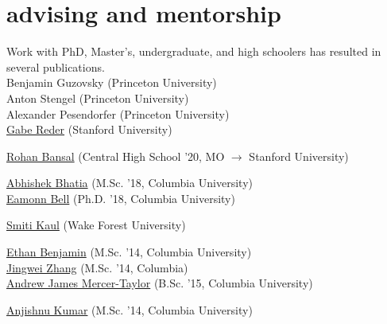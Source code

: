 \documentclass[4pt, letterpaper]{article}
\begin{document}
\section*{advising and mentorship}
Work with PhD, Master's, undergraduate, and high schoolers has resulted in several publications.\\
Benjamin Guzovsky (Princeton University)\\
Anton Stengel (Princeton University)\\
Alexander Pesendorfer (Princeton University)\\
\href{https://vpge.stanford.edu/people/gabe-reder}{Gabe Reder} (Stanford University)

\href{https://rohan.page/}{Rohan Bansal} (Central High School '20, MO $\rightarrow$ Stanford University)

\href{http://abhishekb.herokuapp.com/}{Abhishek
Bhatia} (M.Sc. '18, Columbia University) \\
\href{https://www.eamonnbell.com/}{Eamonn Bell} (Ph.D. '18, Columbia University)

\href{https://smiti.xyz/}{Smiti Kaul} (Wake Forest University)

\href{https://www.linkedin.com/in/ethan-benjamin-9b584a15}{Ethan Benjamin} (M.Sc. '14, Columbia University)\\
\href{http://iceboal.com/}{Jingwei Zhang} (M.Sc. '14, Columbia)\\
\href{https://web.archive.org/web/20160622144138/http://engineering.columbia.edu/andrew-mercer-taylor}{Andrew James Mercer-Taylor} (B.Sc. '15, Columbia University)

\href{http://anjishnu.github.io/}{Anjishnu Kumar} (M.Sc. '14, Columbia University)
\end{document}
